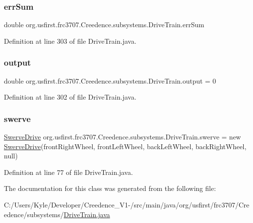 \subsubsection{\texorpdfstring{errSum}{errSum}}
{\footnotesize\ttfamily double org.\+usfirst.\+frc3707.\+Creedence.\+subsystems.\+Drive\+Train.\+err\+Sum}



Definition at line 303 of file Drive\+Train.\+java.

\mbox{\label{classorg_1_1usfirst_1_1frc3707_1_1_creedence_1_1subsystems_1_1_drive_train_a7d940c415d3810efea233a1c4d8419d4}} 
\subsubsection{\texorpdfstring{output}{output}}
{\footnotesize\ttfamily double org.\+usfirst.\+frc3707.\+Creedence.\+subsystems.\+Drive\+Train.\+output = 0}



Definition at line 302 of file Drive\+Train.\+java.

\mbox{\label{classorg_1_1usfirst_1_1frc3707_1_1_creedence_1_1subsystems_1_1_drive_train_a7954d8aff6e4d46fc583b9db0d82b896}} 
\subsubsection{\texorpdfstring{swerve}{swerve}}
{\footnotesize\ttfamily \mbox{\hyperlink{classorg_1_1usfirst_1_1frc3707_1_1_creedence_1_1swerve_1_1_swerve_drive}{Swerve\+Drive}} org.\+usfirst.\+frc3707.\+Creedence.\+subsystems.\+Drive\+Train.\+swerve = new \mbox{\hyperlink{classorg_1_1usfirst_1_1frc3707_1_1_creedence_1_1swerve_1_1_swerve_drive}{Swerve\+Drive}}(front\+Right\+Wheel, front\+Left\+Wheel, back\+Left\+Wheel, back\+Right\+Wheel, null)}



Definition at line 77 of file Drive\+Train.\+java.



The documentation for this class was generated from the following file\+:\begin{DoxyCompactItemize}
\item 
C\+:/\+Users/\+Kyle/\+Developer/\+Creedence\+\_\+\+V1-\//src/main/java/org/usfirst/frc3707/\+Creedence/subsystems/\mbox{\hyperlink{_drive_train_8java}{Drive\+Train.\+java}}\end{DoxyCompactItemize}
